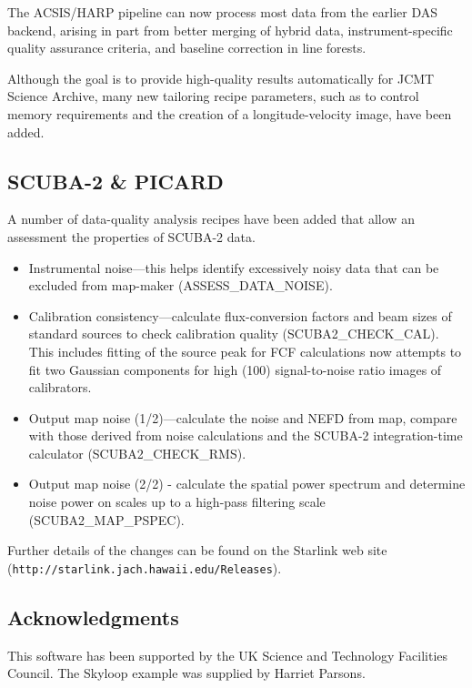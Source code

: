 \documentclass[11pt,twoside]{article}
\begin{document}

The ACSIS/HARP pipeline can now process most data from the earlier DAS
backend, arising in part from better merging of hybrid data,
instrument-specific quality assurance criteria, and baseline
correction in line forests.

Although the goal is to provide high-quality results automatically for
JCMT Science Archive, many new tailoring recipe parameters, such as to
control memory requirements and the creation of a longitude-velocity
image, have been added.

\subsection*{SCUBA-2 \& PICARD}

A number of data-quality analysis recipes have been added that allow
an assessment the properties of SCUBA-2 data.
\begin{itemize}
\item Instrumental noise---this helps identify excessively noisy data that
can be excluded from map-maker (ASSESS\_DATA\_NOISE).
\item Calibration consistency---calculate flux-conversion factors and beam
sizes of standard sources to check calibration quality
(SCUBA2\_CHECK\_CAL).  This includes fitting of the source peak for FCF
calculations now attempts to fit two Gaussian components for high
(100) signal-to-noise ratio images of calibrators.
\item Output map noise (1/2)---calculate the noise and NEFD from map,
compare with those derived from noise calculations and the SCUBA-2
integration-time calculator (SCUBA2\_CHECK\_RMS).
\item Output map noise (2/2) - calculate the spatial power spectrum and
determine noise power on scales up to a high-pass filtering scale
(SCUBA2\_MAP\_PSPEC).
\end{itemize}


Further details of the changes can be found on the Starlink
web site\newline
(\texttt{http://starlink.jach.hawaii.edu/Releases}).

\subsection{Acknowledgments}
This software has been supported by the UK Science and Technology
Facilities Council.  The Skyloop example was supplied by Harriet
Parsons.


\end{document}
